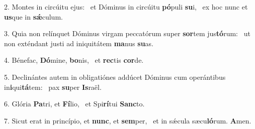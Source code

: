 2. Montes in circúitu ejus: \dag\  et Dóminus in circúitu \textbf{pó}puli \textbf{su}i, \ast\  ex hoc nunc et \textbf{us}que in \textbf{sǽ}culum.\

3. Quia non relínquet Dóminus virgam peccatórum super \textbf{sor}tem jus\textbf{tó}rum: \ast\  ut non exténdant justi ad iniquitátem \textbf{ma}nus \textbf{su}as.\

4. Bénefac, \textbf{Dó}mine, \textbf{bo}nis, \ast\  et \textbf{rec}tis \textbf{cor}de.\

5. Declinántes autem in obligatiónes addúcet Dóminus cum operántibus in\textbf{i}qui\textbf{tá}tem: \ast\  pax \textbf{su}per \textbf{Is}raël.\

6. Glória \textbf{Pa}tri, et \textbf{Fí}lio, \ast\  et Spi\textbf{rí}tui \textbf{Sanc}to.\

7. Sicut erat in princípio, et \textbf{nunc}, et \textbf{sem}per, \ast\  et in sǽcula sæcu\textbf{ló}rum. \textbf{A}men.\

